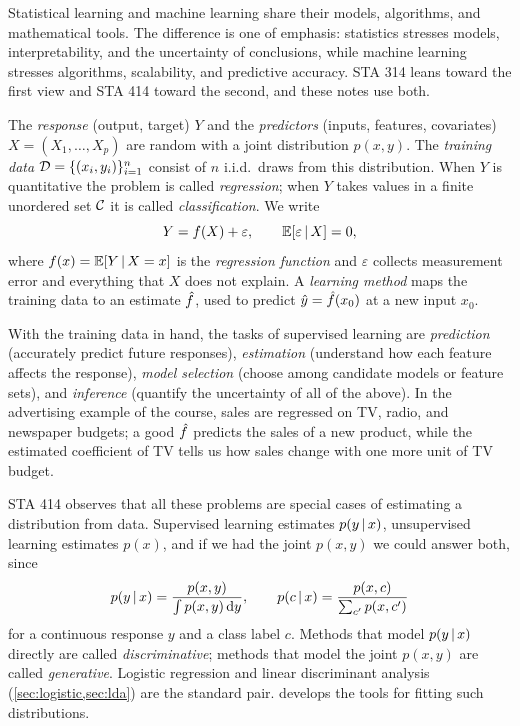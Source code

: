 Statistical learning and machine learning share their models, algorithms, and mathematical tools. The difference is one of emphasis: statistics stresses models, interpretability, and the uncertainty of conclusions, while machine learning stresses algorithms, scalability, and predictive accuracy. STA 314 leans toward the first view and STA 414 toward the second, and these notes use both.

\begin{definition}\label{def:supervised}
The \emph{response} (output, target) $Y$ and the \emph{predictors} (inputs, features, covariates) $X=(X_1,\dots,X_p)$ are random with a joint distribution $p(x,y)$. The \emph{training data} $\mathcal{D}=\{(x_i,y_i)\}_{i=1}^n$ consist of $n$ i.i.d.\ draws from this distribution. When $Y$ is quantitative the problem is called \emph{regression}; when $Y$ takes values in a finite unordered set $\mathcal{C}$ it is called \emph{classification}. We write
\[
Y=f(X)+\varepsilon,\qquad \mathbb{E}[\varepsilon\,|\, X]=0,
\]
where $f(x)=\mathbb{E}[Y\,|\, X=x]$ is the \emph{regression function} and $\varepsilon$ collects measurement error and everything that $X$ does not explain. A \emph{learning method} maps the training data to an estimate $\hat f$, used to predict $\hat y=\hat f(x_0)$ at a new input $x_0$.
\end{definition}

With the training data in hand, the tasks of supervised learning are \emph{prediction} (accurately predict future responses), \emph{estimation} (understand how each feature affects the response), \emph{model selection} (choose among candidate models or feature sets), and \emph{inference} (quantify the uncertainty of all of the above). In the advertising example of the course, sales are regressed on TV, radio, and newspaper budgets; a good $\hat f$ predicts the sales of a new product, while the estimated coefficient of TV tells us how sales change with one more unit of TV budget.

\begin{remark}\label{rem:prob-view}
STA 414 observes that all these problems are special cases of estimating a distribution from data. Supervised learning estimates $p(y\,|\, x)$, unsupervised learning estimates $p(x)$, and if we had the joint $p(x,y)$ we could answer both, since
\[
p(y\,|\, x)=\frac{p(x,y)}{\int p(x,y)\,\mathrm{d} y},\qquad p(c\,|\, x)=\frac{p(x,c)}{\sum_{c'}p(x,c')}
\]
for a continuous response $y$ and a class label $c$. Methods that model $p(y\,|\, x)$ directly are called \emph{discriminative}; methods that model the joint $p(x,y)$ are called \emph{generative}. Logistic regression and linear discriminant analysis (\cref{sec:logistic,sec:lda}) are the standard pair.  develops the tools for fitting such distributions.
\end{remark}

